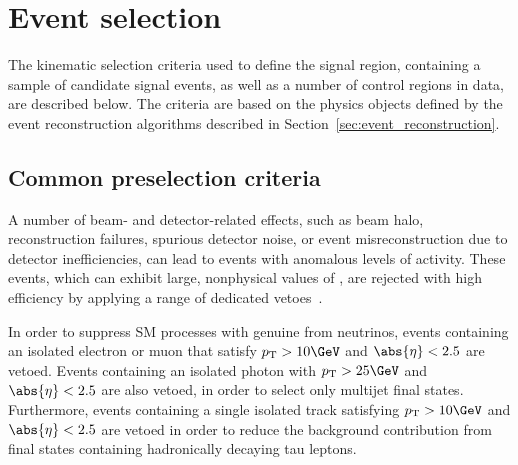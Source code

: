 \section{Event selection}
\label{sec:event_selection}

The kinematic selection criteria used to define the signal region,
containing a sample of candidate signal events, as well as a number of
control regions in data, are described below. The criteria are based
on the physics objects defined by the event reconstruction algorithms
described in Section~\ref{sec:event_reconstruction}.

\subsection{Common preselection criteria}
\label{sec:preselection}

A number of beam- and detector-related effects, such as beam halo,
reconstruction failures, spurious detector noise, or event
misreconstruction due to detector inefficiencies, can lead to events
with anomalous levels of activity. These events, which can exhibit
large, nonphysical values of \ETmiss, are rejected with high
efficiency by applying a range of dedicated
vetoes~\cite{1748-0221-5-03-T03014, cms-met}.

In order to suppress SM processes with genuine \ptvecmiss from
neutrinos, events containing an isolated electron or muon that satisfy
$\Pt > 10\GeV$ and $\abs{\eta} < 2.5$ are vetoed. Events containing an
isolated photon with $\Pt > 25\GeV$ and $\abs{\eta} < 2.5$ are also
vetoed, in order to select only multijet final states. Furthermore,
events containing a single isolated track satisfying $\Pt > 10\GeV$
and $\abs{\eta} < 2.5$ are vetoed in order to reduce the background
contribution from final states containing hadronically decaying tau
leptons.

